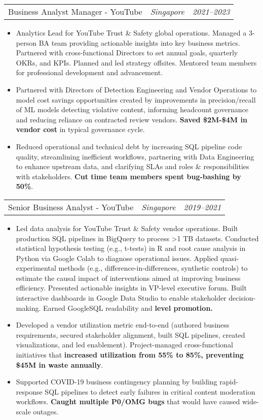 \documentclass[letterpaper,11pt]{article}
\makeatletter
\newcommand{\resumeItem}[1]{
  \item\small{
    {#1}
  }
}
\newcommand{\resumePosition}[3]{
  \item
    \begin{tabular*}{0.96\textwidth}[t]{p{9cm}p{6cm}@{\extracolsep{\fill}}r}
      #1 & \textit{#2} & \textit{#3} \\
    \end{tabular*}
}
\newcommand{\resumeItemListStart}{\begin{itemize}[label=-]}
\newcommand{\resumeItemListEnd}{\end{itemize}}
\makeatother
\begin{document}
          \resumePosition{Business Analyst Manager - YouTube}{Singapore}{2021–2023}
            \resumeItemListStart
              \resumeItem{Analytics Lead for YouTube Trust \& Safety global operations. Managed a 3-person BA team providing actionable insights into key business metrics. Partnered with cross-functional Directors to set annual goals, quarterly OKRs, and KPIs. Planned and led strategy offsites. Mentored team members for professional development and advancement.}
              \resumeItem{Partnered with Directors of Detection Engineering and Vendor Operations to model cost savings opportunities created by improvements in precision/recall of ML models detecting violative content, informing headcount governance and reducing reliance on contracted review vendors. \textbf{Saved \$2M-\$4M in vendor cost} in typical governance cycle.}
              \resumeItem{Reduced operational and technical debt by increasing SQL pipeline code quality, streamlining inefficient workflows, partnering with Data Engineering to enhance upstream data, and clarifying SLAs and roles \& responsibilities with stakeholders. \textbf{Cut time team members spent bug-bashing by 50\%}.}
            \resumeItemListEnd
    
          \resumePosition{Senior Business Analyst - YouTube}{Singapore}{2019–2021}
            \resumeItemListStart
              \resumeItem{Led data analysis for YouTube Trust \& Safety vendor operations. Built production SQL pipelines in BigQuery to process \textgreater 1 TB datasets. Conducted statistical hypothesis testing (e.g., t-tests) in R and root cause analysis in Python via Google Colab to diagnose operational issues. Applied quasi-experimental methods (e.g., difference-in-differences, synthetic controls) to estimate the causal impact of interventions aimed at improving business efficiency. Presented actionable insights in VP-level executive forum. Built interactive dashboards in Google Data Studio to enable stakeholder decision-making. Earned GoogleSQL readability and \textbf{level promotion.}}
              \resumeItem{Developed a vendor utilization metric end-to-end (authored business requirements, secured stakeholder alignment, built SQL pipelines, created visualizations, and led enablement). Project-managed cross-functional initiatives that \textbf{increased utilization from 55\% to 85\%, preventing \$45M in waste annually}.}
              \resumeItem{Supported COVID-19 business contingency planning by building rapid-response SQL pipelines to detect early failures in critical content moderation workflows. \textbf{Caught multiple P0/OMG bugs} that would have caused wide-scale outages.}
            \resumeItemListEnd
        
\end{document}
